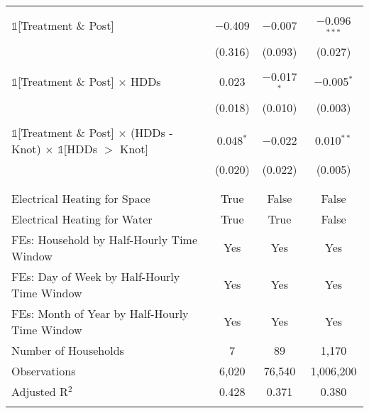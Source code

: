 \begin{table}[!htbp]
\begin{tabular}{@{\extracolsep{20pt}}lccc}
  & & & \\ 
 $\mathbb{1}$[Treatment \& Post] & $-$0.409 & $-$0.007 & $-$0.096$^{***}$ \\ 
  & (0.316) & (0.093) & (0.027) \\ 
  & & & \\ 
 $\mathbb{1}$[Treatment \& Post] $\times$ HDDs & 0.023 & $-$0.017$^{*}$ & $-$0.005$^{*}$ \\ 
  & (0.018) & (0.010) & (0.003) \\ 
  & & & \\ 
 $\mathbb{1}$[Treatment \& Post] $\times$ (HDDs - Knot) $\times$ $\mathbb{1}$[HDDs $>$ Knot] & 0.048$^{*}$ & $-$0.022 & 0.010$^{**}$ \\ 
  & (0.020) & (0.022) & (0.005) \\ 
  & & & \\ 
\hline \\[-1.8ex] 
Electrical Heating for Space & True & False & False \\ 
Electrical Heating for Water & True & True & False \\ 
FEs: Household by Half-Hourly Time Window & Yes & Yes & Yes \\ 
FEs: Day of Week by Half-Hourly Time Window & Yes & Yes & Yes \\ 
FEs: Month of Year by Half-Hourly Time Window & Yes & Yes & Yes \\ 
Number of Households &     7 &    89 & 1,170 \\ 
Observations & 6,020 & 76,540 & 1,006,200 \\ 
Adjusted R$^{2}$ & 0.428 & 0.371 & 0.380 \\ 
\hline 
\hline \\[-1.8ex] 
\end{tabular} 
\end{table} 
